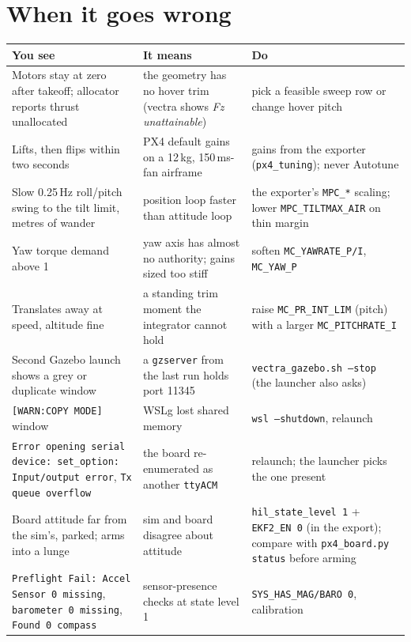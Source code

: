 \documentclass[11pt,a4paper]{article}
\newcommand{\file}[1]{\texttt{#1}}
\newcommand{\param}[1]{\texttt{#1}}
\begin{document}
\section{When it goes wrong}

\begin{longtable}{p{4.6cm}p{4.9cm}p{5.4cm}}
\toprule
\textbf{You see} & \textbf{It means} & \textbf{Do} \\
\midrule
\endhead
Motors stay at zero after takeoff; allocator reports thrust unallocated & the geometry has no hover
trim (vectra shows \emph{Fz unattainable}) & pick a feasible sweep row or change hover pitch \\
Lifts, then flips within two seconds & PX4 default gains on a 12\,kg, 150\,ms-fan airframe & gains
from the exporter (\file{px4\_tuning}); never Autotune \\
Slow 0.25\,Hz roll/pitch swing to the tilt limit, metres of wander & position loop faster than
attitude loop & the exporter's \param{MPC\_*} scaling; lower \param{MPC\_TILTMAX\_AIR} on thin margin \\
Yaw torque demand above 1 & yaw axis has almost no authority; gains sized too stiff & soften
\param{MC\_YAWRATE\_P/I}, \param{MC\_YAW\_P} \\
Translates away at speed, altitude fine & a standing trim moment the integrator cannot hold &
raise \param{MC\_PR\_INT\_LIM} (pitch) with a larger \param{MC\_PITCHRATE\_I} \\
Second Gazebo launch shows a grey or duplicate window & a \file{gzserver} from the last run holds
port 11345 & \file{vectra\_gazebo.sh --stop} (the launcher also asks) \\
\texttt{[WARN:COPY MODE]} window & WSLg lost shared memory & \file{wsl --shutdown}, relaunch \\
\texttt{Error opening serial device: set\_option: Input/output error}, \texttt{Tx queue overflow}
& the board re-enumerated as another \file{ttyACM} & relaunch; the launcher picks the one present \\
Board attitude far from the sim's, parked; arms into a lunge & sim and board disagree about
attitude & \param{hil\_state\_level 1} + \param{EKF2\_EN 0} (in the export); compare with
\file{px4\_board.py status} before arming \\
\texttt{Preflight Fail: Accel Sensor 0 missing}, \texttt{barometer 0 missing}, \texttt{Found 0
compass} & sensor-presence checks at state level 1 & \param{SYS\_HAS\_MAG/BARO 0}, calibration

\end{longtable}
\end{document}
